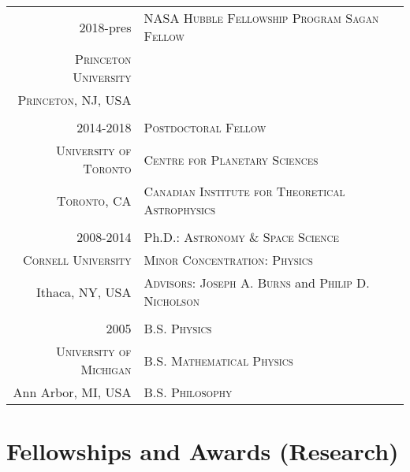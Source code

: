 \documentclass[10pt]{article} %
\begin{document}
\begin{tabular}{r|p{11cm}}
{2018-pres} & \textsc{NASA Hubble Fellowship Program Sagan  Fellow} \\
\textsc{Princeton University} & \\
 \textsc{Princeton, NJ, USA} &  \\

\multicolumn{2}{c}{} \\

{2014-2018} & \textsc{Postdoctoral Fellow} \\
\textsc{University of Toronto} & \textsc{Centre for Planetary Sciences} \\
\textsc{Toronto, CA} & \textsc{Canadian Institute for Theoretical Astrophysics} \\

\multicolumn{2}{c}{} \\

\textsc{2008-2014} & Ph.D.: \textsc{Astronomy \& Space Science} \\
\textsc{Cornell University} & \textsc{Minor Concentration}:  \textsc{Physics} \\
Ithaca, NY, USA & \textsc{Advisors}: \textsc{Joseph A. Burns} and \textsc{Philip D. Nicholson}\\

\multicolumn{2}{c}{} \\


\textsc{2005} & \textsc{B.S. Physics} \\
\textsc{University of Michigan} & \textsc{B.S. Mathematical Physics} \\
Ann Arbor, MI, USA & \textsc{B.S. Philosophy} \\
\end{tabular}


\section{Fellowships and Awards (Research)}
\end{document}
